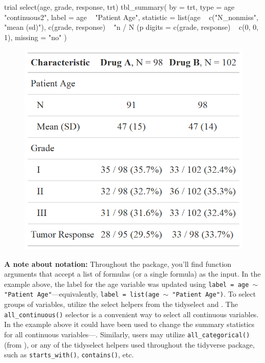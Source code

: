 \begin{example}
trial %
  select(age, grade, response, trt) %
  tbl_summary(
    by = trt,
    type = age ~ "continuous2",
    label = age ~ "Patient Age",
    statistic = list(age ~ c("{N_nonmiss}", "{mean} ({sd})"),
                     c(grade, response) ~ "{n} / {N} ({p}%
    digits = c(grade, response) ~ c(0, 0, 1),
    missing = "no"
  )
\end{example}
\begin{figure}[h!]
  \includegraphics[scale=0.28]{summary_plus.png}
  \centering
\end{figure}

\textbf{A note about notation:}
Throughout the  package, you'll find function arguments that accept a list of formulas (or a single formula) as the input.
In the example above, the label for the age variable was updated using \texttt{label = age $\sim$ "Patient Age"}---equivalently, \texttt{label = list(age $\sim$ "Patient Age")}.
To select groups of variables, utilize the select helpers from the tidyselect \citep{tidyselect} and .
The \texttt{all\_continuous()} selector is a convenient way to select all continuous variables.
In the example above it could have been used to change the summary statistics for all continuous variables---. 
Similarly, users may utilize \texttt{all\_categorical()} (from ), or any of the tidyselect helpers used throughout the tidyverse \citep{tidyverse} package, such as \texttt{starts\_with()}, \texttt{contains()}, etc.

